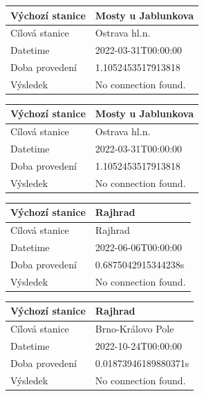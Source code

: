 \documentclass[10pt,xcolor=pdflatex,dvipsnames,table,oneside]{book}
\begin{document}
\vspace{1em}
\begin{tabular}{|l|l|}
    \hline
    Výchozí stanice & Mosty u Jablunkova \\
    \hline
    Cílová stanice & Ostrava hl.n. \\
    \hline
    Datetime & 2022-03-31T00:00:00 \\
    \hline
    Doba provedení & 1.1052453517913818 \\
    \hline
    Výsledek & No connection found. \\
    \hline
\end{tabular}

\vspace{1em}
\begin{tabular}{|l|l|}
    \hline
    Výchozí stanice & Mosty u Jablunkova \\
    \hline
    Cílová stanice & Ostrava hl.n. \\
    \hline
    Datetime & 2022-03-31T00:00:00 \\
    \hline
    Doba provedení & 1.1052453517913818 \\
    \hline
    Výsledek & No connection found. \\
    \hline
\end{tabular}

\vspace{1em}
\begin{tabular}{|l|l|}
    \hline
    Výchozí stanice & Rajhrad \\
    \hline
    Cílová stanice & Rajhrad \\
    \hline
    Datetime & 2022-06-06T00:00:00 \\
    \hline
    Doba provedení & 0.6875042915344238s \\
    \hline
    Výsledek & No connection found. \\
    \hline
\end{tabular}

\vspace{1em}
\begin{tabular}{|l|l|}
    \hline
    Výchozí stanice & Rajhrad \\
    \hline
    Cílová stanice & Brno-Královo Pole \\
    \hline
    Datetime & 2022-10-24T00:00:00 \\
    \hline
    Doba provedení & 0.01873946189880371s \\
    \hline
    Výsledek & No connection found. \\
    \hline
\end{tabular}
\end{document}

